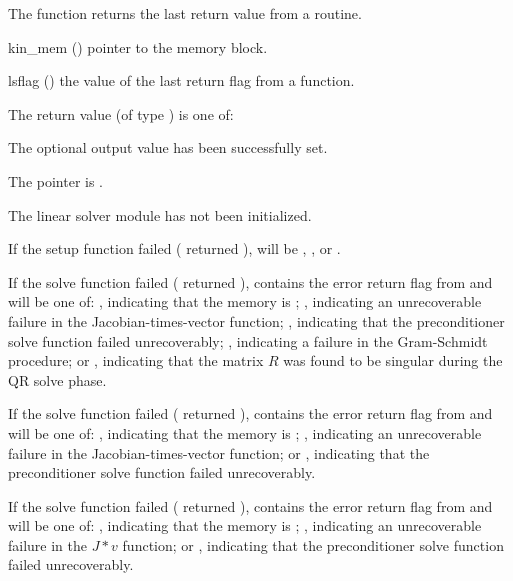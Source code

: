 {
  The function  returns the
  last return value from a {\kinspils} routine. 
}
{
  \begin{args}
  \item[kin\_mem] ()
    pointer to the {\kinsol} memory block.
  \item[lsflag] ()
    the value of the last return flag from a {\kinspils} function.
  \end{args}
}
{
  The return value  (of type ) is one of:
  \begin{args}
  \item[\Id{KINSPILS\_SUCCESS}] 
    The optional output value has been successfully set.
  \item[\Id{KINSPILS\_MEM\_NULL}]
    The  pointer is .
  \item[\Id{KINSPILS\_LMEM\_NULL}]
    The linear solver module has not been initialized.
  \end{args}
}
{
  If the {\kinspils} setup function failed ( returned
  ),  will be
  , , or
  .

  If the {\kinspgmr} solve function failed ( returned
  ),  contains the error return flag from
   and will be one of:
  , indicating that the {\spgmr} memory is ;
  , indicating an unrecoverable failure in the 
  Jacobian-times-vector function;
  , indicating that the preconditioner solve
  function  failed unrecoverably;
  , indicating a failure in the Gram-Schmidt procedure; 
  or , indicating that the matrix $R$ was found to be
  singular during the QR solve phase.

  If the {\kinspbcg} solve function failed ( returned
  ),  contains the error return flag from
   and will be one of:
  , indicating that the {\spbcg} memory is ;
  , indicating an unrecoverable failure in the 
  Jacobian-times-vector function; or
  , indicating that the preconditioner solve
  function  failed unrecoverably.

  If the {\kinsptfqmr} solve function failed ( returned
  ),  contains the error return flag from
   and will be one of:
  , indicating that the {\sptfqmr} memory is ;
  , indicating an unrecoverable failure in the 
  $J*v$ function; or 
  , indicating that the preconditioner solve
  function  failed unrecoverably.
}


